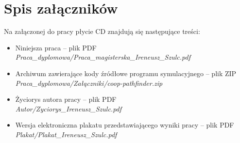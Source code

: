 \chapter*{Spis załączników}

Na załączonej do pracy płycie CD znajdują się następujące treści:
\begin{itemize}
	\item Niniejsza praca -- plik PDF\\ \textit{Praca\_dyplomowa/Praca\_magisterska\_Ireneusz\_Szulc.pdf}
	\item Archiwum zawierające kody źródłowe programu symulacyjnego -- plik ZIP\\ \textit{Praca\_dyplomowa/Załączniki/coop-pathfinder.zip}
	\item Życiorys autora pracy -- plik PDF\\ \textit{Autor/Zyciorys\_Ireneusz\_Szulc.pdf}
	\item Wersja elektroniczna plakatu przedstawiającego wyniki pracy -- plik PDF\\ \textit{Plakat/Plakat\_Ireneusz\_Szulc.pdf}
\end{itemize}
